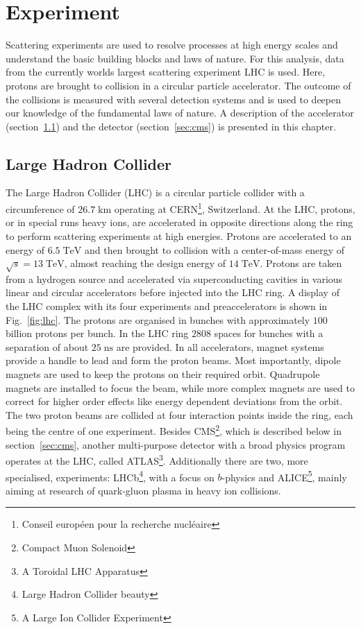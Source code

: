 \chapter{Experiment}
\label{ch:Exp}
	Scattering experiments are used to resolve processes at high energy scales and understand the basic building blocks and laws of nature. For this analysis, data from the currently worlds largest scattering experiment LHC is used. Here, protons are brought to collision in a circular particle accelerator. The outcome of the collisions is measured with several detection systems and is used to deepen our knowledge of the fundamental laws of nature. A description of the accelerator (section~\ref{sec:lhc}) and the detector (section~\ref{sec:cms}) is presented in this chapter.
\section{Large Hadron Collider}
\label{sec:lhc}
	The Large Hadron Collider (LHC) is a circular particle collider with a circumference of $26.7\;\text{km}$ operating at CERN\footnote{Conseil europ\'{e}en pour la recherche nucl\'{e}aire}, Switzerland. At the LHC, protons, or in special runs heavy ions, are accelerated in opposite directions along the ring to perform scattering experiments at high energies. Protons are accelerated to an energy of $6.5\;\text{TeV}$ and then brought to collision with a center-of-mass energy of $\sqrt{s}=13\;\text{TeV}$, almost reaching the design energy of $14\;\text{TeV}$. Protons are taken from a hydrogen source and accelerated via superconducting cavities in various linear and circular accelerators before injected into the LHC ring. A display of the LHC complex with its four experiments and preaccelerators is shown in Fig.~\ref{fig:lhc}. The protons are organised in bunches with approximately $100$ billion protons per bunch. In the LHC ring $2808$ spaces for bunches with a separation of about $25\;\text{ns}$ are provided. In all accelerators, magnet systems provide a handle to lead and form the proton beams. Most importantly, dipole magnets are used to keep the protons on their required orbit. Quadrupole magnets are installed to focus the beam, while more complex magnets are used to correct for higher order effects like energy dependent deviations from the orbit. The two proton beams are collided at four interaction points inside the ring, each being the centre of one experiment. Besides CMS\footnote{Compact Muon Solenoid}, which is described below in section~\ref{sec:cms},  another multi-purpose detector with a broad physics program operates at the LHC, called ATLAS\footnote{A Toroidal LHC Apparatus}. Additionally there are two, more specialised, experiments: LHCb\footnote{Large Hadron Collider beauty}, with a focus on $b$-physics and ALICE\footnote{A Large Ion Collider Experiment}, mainly aiming at research of quark-gluon plasma in heavy ion collisions. \\
